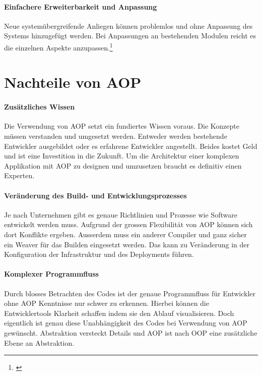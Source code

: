 \paragraph{Einfachere Erweiterbarkeit und Anpassung}
Neue systemübergreifende Anliegen können problemlos und ohne Anpassung des Systems hinzugefügt werden. Bei Anpassungen an bestehenden Modulen reicht es die einzelnen Aspekte anzupassen.\footnote{\cite{aop:benefits}}
\section{Nachteile von AOP}
\paragraph{Zusätzliches Wissen}
Die Verwendung von AOP setzt ein fundiertes Wissen voraus. Die Konzepte müssen verstanden und umgesetzt werden. Entweder werden bestehende Entwickler ausgebildet oder es erfahrene Entwickler angestellt. Beides kostet Geld und ist eine Investition in die Zukunft. Um die Architektur einer komplexen Applikation mit AOP zu designen und umzusetzen braucht es definitiv einen Experten.
\paragraph{Veränderung des Build- und Entwicklungsprozesses}
Je nach Unternehmen gibt es genaue Richtlinien und Prozesse wie Software entwickelt werden muss. Aufgrund der grossen Flexibilität von AOP können sich dort Konflikte ergeben. Ausserdem muss ein anderer Compiler und ganz sicher ein Weaver für das Builden eingesetzt werden. Das kann zu Veränderung in der Konfiguration der Infrastruktur und des Deployments führen.
\paragraph{Komplexer Programmfluss}
Durch blosses Betrachten des Codes ist der genaue Programmfluss für Entwickler ohne AOP Kenntnisse nur schwer zu erkennen. Hierbei können die Entwicklertools Klarheit schaffen indem sie den Ablauf visualisieren. Doch eigentlich ist genau diese Unabhängigkeit des Codes bei Verwendung von AOP gewünscht. Abstraktion versteckt Details und AOP ist nach OOP eine zusätzliche Ebene an Abstraktion.
